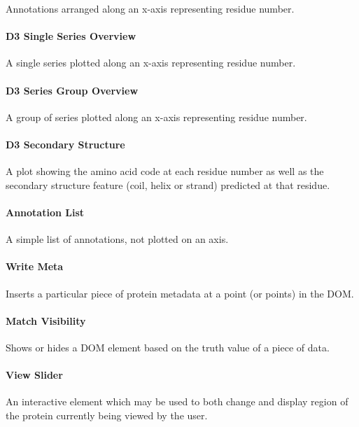 \documentclass[fleqn,10pt]{article} %
\begin{document}
Annotations arranged along an x-axis representing residue number.

\paragraph{D3 Single Series Overview}

A single series plotted along an x-axis representing residue number.

\paragraph{D3 Series Group Overview}

A group of series plotted along an x-axis representing residue number.

\paragraph{D3 Secondary Structure}

A plot showing the amino acid code at each residue number as well as the secondary structure feature (coil, helix or strand) predicted at that residue.

\paragraph{Annotation List}

A simple list of annotations, not plotted on an axis.

\paragraph{Write Meta}

Inserts a particular piece of protein metadata at a point (or points) in the DOM.

\paragraph{Match Visibility}

Shows or hides a DOM element based on the truth value of a piece of data.

\paragraph{View Slider}

An interactive element which may be used to both change and display region of the protein currently being viewed by the user.
\end{document}
